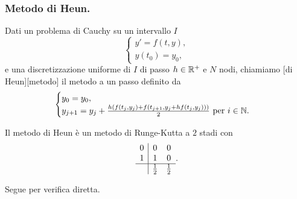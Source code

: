\subsubsection{Metodo di Heun.}
\label{MetodiNumericiPerEquazioniDifferenzialiOrdinarie_MetodoDiHeun}
\begin{Definition}
	Dati un problema di Cauchy su un intervallo $I$
	\[
	\begin{cases}
		y' = f(t,y),\\
		y(t_0) = y_0,
	\end{cases}
	\]
	e una discretizzazione uniforme di $I$ di passo $h \in \mathbb{R}^+$ e $N$ nodi, chiamiamo [di Heun][metodo] il metodo a un passo definito da
	\[
	\begin{cases}
		y_0 = y_0,\\
		y_{j + 1} = y_j + \frac{h (f(t_j,y_j) + f(t_{j + 1},y_j + h f(t_j,y_j)))}{2}\text{ per }i \in \mathbb{N}.
	\end{cases}
	\]
\end{Definition}
\begin{Theorem}
	Il metodo di Heun \`e un metodo di Runge-Kutta a $2$ stadi con \tableau
	\[
	\begin{array}{c|cc}
	0	&	0	&	0\\
	1	&	1	&	0\\
	\hline
		&	\frac{1}{2}	&	\frac{1}{2}
	\end{array}.
	\]
\end{Theorem}
\Proof Segue per verifica diretta. \EndProof

